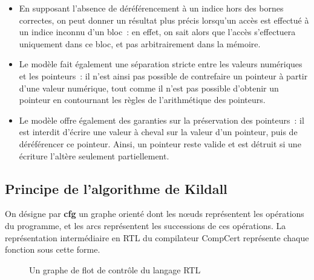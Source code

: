 \documentclass{article}
\begin{document}
\begin{itemize}

\item En supposant l'absence de déréférencement à un indice hors des bornes
correctes, on peut donner un résultat plus précis lorsqu'un accès est effectué
à un indice inconnu d'un bloc~: en effet, on sait alors que l'accès
s'effectuera uniquement dans ce bloc, et pas arbitrairement dans la mémoire.

\item Le modèle fait également une séparation stricte entre les valeurs
numériques et les pointeurs~: il n'est ainsi pas possible de contrefaire un
pointeur à partir d'une valeur numérique, tout comme il n'est pas possible
d'obtenir un pointeur en contournant les règles de l'arithmétique des
pointeurs.

\item Le modèle offre également des garanties sur la préservation des
pointeurs~: il est interdit d'écrire une valeur à cheval sur la valeur d'un
pointeur, puis de déréférencer ce pointeur. Ainsi, un pointeur reste valide et
est détruit si une écriture l'altère seulement partiellement.

\end{itemize}

\subsection{Principe de l'algorithme de Kildall}

On désigne par {\bf \gls{cfg}} un graphe orienté dont les nœuds représentent
les opérations du programme, et les arcs représentent les successions de ces
opérations. La représentation intermédiaire en RTL du compilateur CompCert
représente chaque fonction sous cette forme.

\begin{figure}[ht]
\centering
\caption{Un graphe de flot de contrôle du langage RTL}
\label{cfg}
\end{figure}
\end{document}
